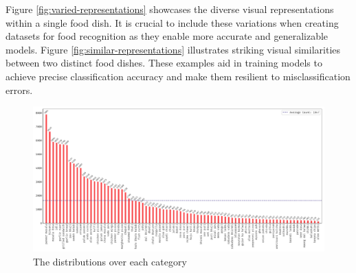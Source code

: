 \documentclass{article}
\begin{document}
Figure \ref{fig:varied-representations} showcases the diverse visual representations within a single food dish. It is crucial to include these variations when creating datasets for food recognition as they enable more accurate and generalizable models. Figure \ref{fig:similar-representations} illustrates striking visual similarities between two distinct food dishes. These examples aid in training models to achieve precise classification accuracy and make them resilient to misclassification errors.

\begin{figure}[h]
	\centering
	\includegraphics[width=\linewidth]{figs/statistics.pdf}
	\caption{The distributions over each category}
	\label{fig:statistics}
\end{figure}
\end{document}
